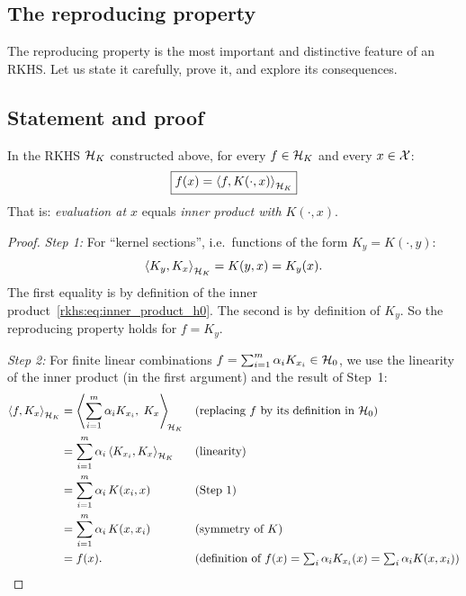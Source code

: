 \begin{notechapter}
\section{The reproducing property}
\label{rkhs:sec:reproducing_property}

The reproducing property is the most important and distinctive feature
of an RKHS. Let us state it carefully, prove it, and explore its
consequences.

\subsection{Statement and proof}

\begin{proposition}
\label{rkhs:prop:reproducing}
In the RKHS $\mathcal{H}_K$ constructed above, for every $f \in \mathcal{H}_K$ and every $x \in \mathcal{X}$:
\begin{equation}
\label{rkhs:eq:reproducing}
\boxed{f(x) = \left\langle f, K(\cdot, x) \right\rangle_{\mathcal{H}_K}}
\end{equation}
That is: \emph{evaluation at $x$} equals \emph{inner product with
$K(\cdot, x)$}.
\end{proposition}

\begin{proof}
\emph{Step 1:} For ``kernel sections'', i.e.\ functions of the form
$K_y = K(\cdot, y)$:
\[
\left\langle K_y, K_x \right\rangle_{\mathcal{H}_K} = K(y, x) = K_y(x).
\]
The first equality is by definition of the inner
product~\eqref{rkhs:eq:inner_product_h0}. The second is by definition of
$K_y$. So the reproducing property holds for $f = K_y$.

\emph{Step 2:} For finite linear combinations
$f = \sum_{i=1}^m \alpha_i K_{x_i} \in \mathcal{H}_0$, we
use the linearity of the inner product (in the first
argument) and the result of Step~1:
\begin{align*}
\left\langle f, K_x \right\rangle_{\mathcal{H}_K}
&= \left\langle \sum_{i=1}^m \alpha_i K_{x_i},\;
   K_x \right\rangle_{\!\mathcal{H}_K}
   && \text{(replacing $f$ by its definition
   in $\mathcal{H}_0$)} \\
&= \sum_{i=1}^m \alpha_i
   \left\langle K_{x_i}, K_x \right\rangle_{\mathcal{H}_K}
   && \text{(linearity)} \\
&= \sum_{i=1}^m \alpha_i\, K(x_i, x)
   && \text{(Step 1)} \\
&= \sum_{i=1}^m \alpha_i\, K(x, x_i)
   && \text{(symmetry of $K$)} \\
&= f(x).
   && \text{(definition of
   $f(x) = \textstyle\sum_i \alpha_i K_{x_i}(x)
   = \textstyle\sum_i \alpha_i K(x, x_i)$)}
\end{align*}


\end{proof}
\end{notechapter}

